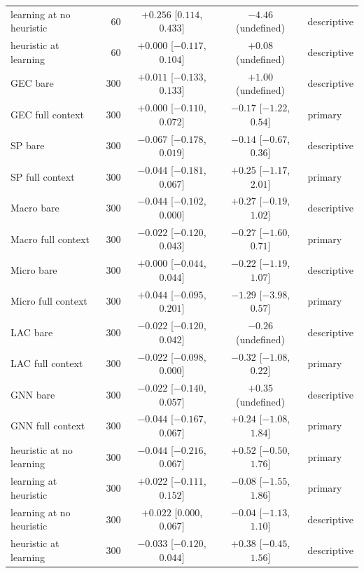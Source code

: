 \documentclass{article}
\begin{document}
{\begin{longtable}{l r c c l}
learning at no heuristic & 60 & $+0.256$ [$0.114$, $0.433$] & $-4.46$ (undefined) & descriptive \\
heuristic at learning & 60 & $+0.000$ [$-0.117$, $0.104$] & $+0.08$ (undefined) & descriptive \\
GEC bare & 300 & $+0.011$ [$-0.133$, $0.133$] & $+1.00$ (undefined) & descriptive \\
GEC full context & 300 & $+0.000$ [$-0.110$, $0.072$] & $-0.17$ [$-1.22$, $0.54$] & primary \\
SP bare & 300 & $-0.067$ [$-0.178$, $0.019$] & $-0.14$ [$-0.67$, $0.36$] & descriptive \\
SP full context & 300 & $-0.044$ [$-0.181$, $0.067$] & $+0.25$ [$-1.17$, $2.01$] & primary \\
Macro bare & 300 & $-0.044$ [$-0.102$, $0.000$] & $+0.27$ [$-0.19$, $1.02$] & descriptive \\
Macro full context & 300 & $-0.022$ [$-0.120$, $0.043$] & $-0.27$ [$-1.60$, $0.71$] & primary \\
Micro bare & 300 & $+0.000$ [$-0.044$, $0.044$] & $-0.22$ [$-1.19$, $1.07$] & descriptive \\
Micro full context & 300 & $+0.044$ [$-0.095$, $0.201$] & $-1.29$ [$-3.98$, $0.57$] & primary \\
LAC bare & 300 & $-0.022$ [$-0.120$, $0.042$] & $-0.26$ (undefined) & descriptive \\
LAC full context & 300 & $-0.022$ [$-0.098$, $0.000$] & $-0.32$ [$-1.08$, $0.22$] & primary \\
GNN bare & 300 & $-0.022$ [$-0.140$, $0.057$] & $+0.35$ (undefined) & descriptive \\
GNN full context & 300 & $-0.044$ [$-0.167$, $0.067$] & $+0.24$ [$-1.08$, $1.84$] & primary \\
heuristic at no learning & 300 & $-0.044$ [$-0.216$, $0.067$] & $+0.52$ [$-0.50$, $1.76$] & primary \\
learning at heuristic & 300 & $+0.022$ [$-0.111$, $0.152$] & $-0.08$ [$-1.55$, $1.86$] & primary \\
learning at no heuristic & 300 & $+0.022$ [$0.000$, $0.067$] & $-0.04$ [$-1.13$, $1.10$] & descriptive \\
heuristic at learning & 300 & $-0.033$ [$-0.120$, $0.044$] & $+0.38$ [$-0.45$, $1.56$] & descriptive \\
\bottomrule
\end{longtable}
}
\end{document}
